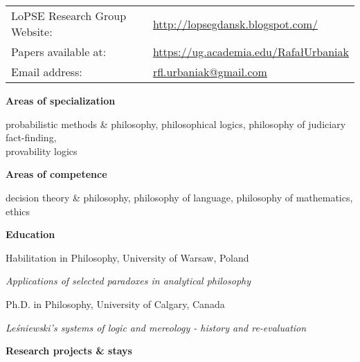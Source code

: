\documentclass[10pt, a4paper]{article}
\newcommand{\years}[1]{\marginnote{\normalsize #1}}
\begin{document}
\vspace{1mm}



\hspace{-2mm}\begin{tabular}{ll}
  LoPSE Research Group Website: & \url{http://lopsegdansk.blogspot.com/} \\

 Papers available at: & \url{https://ug.academia.edu/RafałUrbaniak}\\

Email address: &  \url{rfl.urbaniak@gmail.com}\\
\end{tabular}

\normalsize

\vspace{1mm}

\large {\sc \textbf{Areas of specialization}}
\normalsize
\thispagestyle{empty}


 probabilistic methods \& philosophy, philosophical logics, philosophy of judiciary fact-finding, \\provability logics

\vspace{1mm}

\large
 {\sc \textbf{Areas of competence}}
\normalsize


  decision theory \& philosophy,  philosophy of language, philosophy of mathematics,  ethics


\vspace{1mm}
\large
{\sc \textbf{Education}}
\normalsize


 \years{2013} Habilitation in Philosophy, University of Warsaw, Poland

 \emph{Applications of selected paradoxes in analytical philosophy}

 \years{2008} Ph.D. in Philosophy, University  of  Calgary,  Canada

 \emph{Le\'sniewski's systems of logic and mereology - history and  re-evaluation}




\vspace{1mm}

\large {\sc \textbf{Research projects \& stays}}\normalsize
\end{document}
